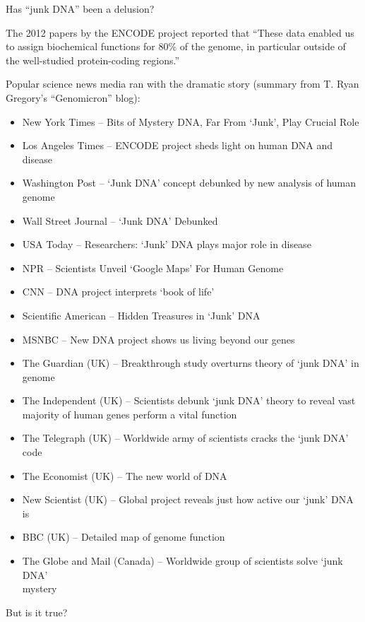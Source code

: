 \documentclass[bluish,slideColor,colorBG,pdf]{prosper}
\begin{document}
\begin{slide}[Replace]{Has ``junk DNA'' been a delusion? }
\vspace{-0.08in}

{\tiny
The 2012 papers by the ENCODE project reported that ``These data enabled us to assign biochemical functions for 80\% of the genome,
in particular outside of the well-studied protein-coding regions.''

Popular science news media ran with the dramatic story (summary from T. Ryan
Gregory's ``Genomicron'' blog):
\vspace{-0.05in}
\hspace{-0.20in} \begin{itemize}
\addtolength{\itemsep}{-0.5\baselineskip}
\item New York Times -- Bits of Mystery DNA, Far From `Junk', Play Crucial Role
\item Los Angeles Times -- ENCODE project sheds light on human DNA and disease
\item Washington Post --  `Junk DNA' concept debunked by new analysis of human genome
\item Wall Street Journal -- `Junk DNA' Debunked
\item USA Today -- Researchers: `Junk' DNA plays major role in disease
\item NPR -- Scientists Unveil `Google Maps' For Human Genome
\item CNN -- DNA project interprets `book of life'
\item Scientific American -- Hidden Treasures in `Junk' DNA
\item MSNBC -- New DNA project shows us living beyond our genes
\item The Guardian (UK) -- Breakthrough study overturns theory of `junk DNA' in genome
\item The Independent (UK) -- Scientists debunk `junk DNA' theory to reveal
vast\\
\vspace{-2pt}
majority of human genes perform a vital function
\item The Telegraph (UK) -- Worldwide army of scientists cracks the `junk DNA' code
\item The Economist (UK) -- The new world of DNA
\item New Scientist (UK) -- Global project reveals just how active our `junk' DNA is
\item BBC (UK) -- Detailed map of genome function
\item The Globe and Mail (Canada) -- Worldwide group of scientists solve `junk
DNA'\\
\vspace{-2pt} mystery
\end{itemize}
}

But is it true?

\end{slide}
\end{document}
